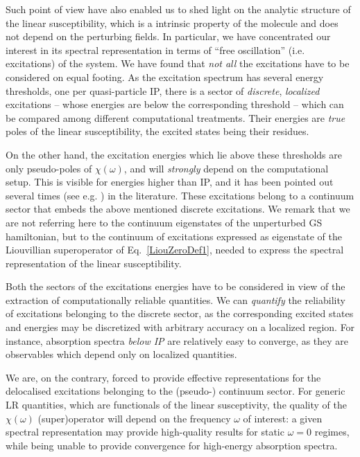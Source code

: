 \documentclass[reprint,aps,prb]{revtex4-1}
\begin{document}
Such point of view have also enabled us to shed light on the analytic structure of the 
linear susceptibility, which is a intrinsic property of the molecule and does not depend on
 the perturbing fields.
 In particular, we have concentrated our interest in its spectral representation in
 terms of ``free oscillation'' (i.e. excitations) of the system.
 We have found that \emph{not all} the excitations have to be considered on equal footing.
 As the excitation spectrum has several energy thresholds, one per quasi-particle IP,
 there is a sector of \emph{discrete}, \emph{localized} excitations -- whose energies are 
below the corresponding threshold -- which can be compared among different computational treatments.
Their energies are \emph{true} poles of the linear susceptibility, the excited states being their residues.

On the other hand, the excitation energies which lie above these thresholds are only pseudo-poles of $\chi(\omega)$, 
and will \emph{strongly} depend on the computational setup. This is visible for energies higher than
IP, and it has been pointed out several times (see e.g. \cite{giustino2012,giustino2014}) in the literature.
These excitations belong to a continuum sector that embeds the above mentioned discrete excitations.
We remark that we are not referring here to the continuum eigenstates of the 
unperturbed GS hamiltonian, %
but to the continuum of excitations expressed as eigenstate of the 
Liouvillian superoperator of Eq.~\eqref{LiouZeroDef1}, needed to 
express the spectral representation of the linear susceptibility.

Both the sectors of the excitations energies have to be considered in view of the extraction of computationally reliable quantities.
We can \emph{quantify} the reliability of excitations belonging to the discrete sector, as the corresponding excited states and energies may be discretized with arbitrary accuracy on a localized region.
For instance, absorption spectra \emph{below IP} are relatively easy to converge, as they are observables which depend only on localized quantities.

We are, on the contrary, forced to provide effective representations for
the delocalised excitations belonging to the (pseudo-) continuum sector.
For generic LR quantities, which are functionals of the linear susceptivity, 
the quality of the $\chi(\omega)$ (super)operator will depend
on the frequency $\omega$ of interest: a given spectral representation may provide high-quality results for static $\omega=0$ regimes, while being
unable to provide convergence for high-energy absorption spectra.
\end{document}
